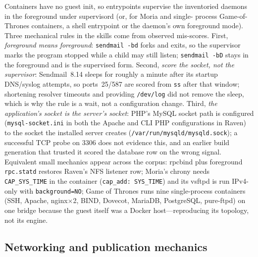 \documentclass[3p,twocolumn,authoryear]{elsarticle}
\begin{document}
Containers have no guest init, so entrypoints supervise the inventoried
daemons in the foreground under supervisord (or, for Moria and single-
process Game-of-Thrones containers, a shell entrypoint or the daemon's
own foreground mode). Three mechanical rules in the skills come from
observed mis-scores. First, \emph{foreground means foreground}:
\texttt{sendmail -bd} forks and exits, so the supervisor marks the
program stopped while a child may still listen; \texttt{sendmail -bD}
stays in the foreground and is the supervised form. Second, \emph{score
the socket, not the supervisor}: Sendmail~8.14 sleeps for roughly a
minute after its startup DNS/syslog attempts, so ports~25/587 are
scored from \texttt{ss} after that window; shortening resolver timeouts
and providing \texttt{/dev/log} did not remove the sleep, which is why
the rule is a wait, not a configuration change. Third, \emph{the
application's socket is the server's socket}: PHP's MySQL socket path
is configured (\texttt{mysql-socket.ini} in both the Apache and CLI
PHP configurations in Raven) to the socket the installed server
creates (\texttt{/var/run/mysqld/mysqld.sock}); a successful TCP probe
on 3306 does not evidence this, and an earlier build generation that
trusted it scored the database row on the wrong signal. Equivalent
small mechanics appear across the corpus: rpcbind plus foreground
\texttt{rpc.statd} restores Raven's NFS listener row; Moria's chrony
needs \texttt{CAP\_SYS\_TIME} in the container
(\texttt{cap\_add: SYS\_TIME}) and its vsftpd is run IPv4-only with
\texttt{background=NO}; Game of Thrones runs nine single-process
containers (SSH, Apache, nginx$\times$2, BIND, Dovecot, MariaDB,
PostgreSQL, pure-ftpd) on one bridge because the guest itself was a
Docker host---reproducing its topology, not its engine.

\subsection{Networking and publication mechanics}
\end{document}
